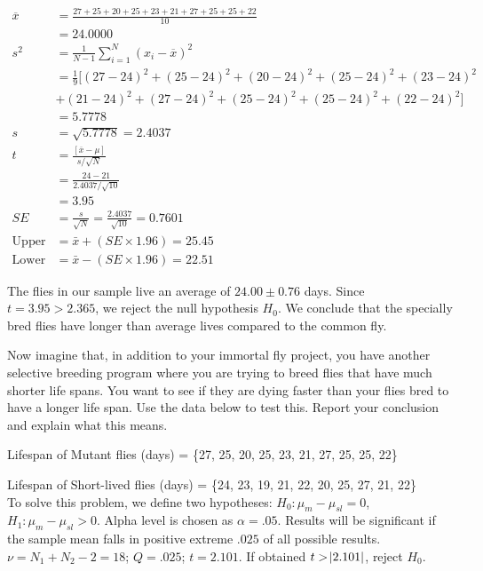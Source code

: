 \documentclass[onecolumn,10pt]{jhwhw}
\begin{document}
\begin{equation*}
\begin{split}
\overline{x} & = \frac{27 + 25 + 20 + 25 + 23 + 21 + 27 + 25 + 25 + 22}{10} \\
             & = 24.0000 \\
s^2 & = \frac{1}{N-1} \sum_{i=1}^N (x_i - \overline{x})^2 \\
    & = \frac{1}{9} [(27-24)^2 + (25-24)^2 + (20-24)^2 + (25-24)^2 + (23-24)^2 \\
    & + (21-24)^2 + (27-24)^2 + (25-24)^2 + (25-24)^2 + (22-24)^2] \\
    & = 5.7778 \\
s & = \sqrt{5.7778} = 2.4037\\
%
t & = \frac{\left[ \overline{x} - \mu \right]}{s/\sqrt{N}} \\
  & = \frac{24 - 21}{2.4037/\sqrt{10}} \\
  & = 3.95\\
%
SE & = \frac{s}{\sqrt{N}} = \frac{2.4037}{\sqrt{10}} = 0.7601 \\
\text{Upper 95\%} & = \bar{x} + (SE \times 1.96) = 25.45 \\
\text{Lower 95\%} & = \bar{x} - (SE \times 1.96) = 22.51
\end{split}
\end{equation*}

The flies in our sample live an average of $24.00 \pm 0.76$ days. Since $t = 3.95 > 2.365$, we reject the null hypothesis $H_0$. We conclude that the specially bred flies have longer than average lives compared to the common fly.

\problem{}
Now imagine that, in addition to your immortal fly project, you have another selective breeding program where you are trying to breed flies that have much shorter life spans. You want to see if they are dying faster than your flies bred to have a longer life span. Use the data below to test this. Report your conclusion and explain what this means.

Lifespan of Mutant flies (days) = \{27, 25, 20, 25, 23, 21, 27, 25, 25, 22\}

Lifespan of Short-lived flies (days) = \{24, 23, 19, 21, 22, 20, 25, 27, 21, 22\} \\

To solve this problem, we define two hypotheses: $H_0: \mu_{m} - \mu_{sl} = 0$, $H_1: \mu_{m} - \mu_{sl} > 0$. Alpha level is chosen as $\alpha = .05$. Results will be significant if the sample mean falls in positive extreme $.025$ of all possible results. $\nu = N_1 + N_2 - 2 = 18$; $Q = .025$; $t = 2.101$. If obtained $t > \abs{2.101}$, reject $H_0$.
\end{document}
